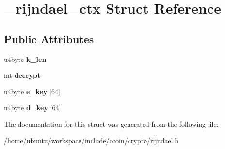 \hypertarget{struct__rijndael__ctx}{\section{\-\_\-rijndael\-\_\-ctx Struct Reference}
\label{struct__rijndael__ctx}
}
\subsection*{Public Attributes}
\begin{DoxyCompactItemize}
\item 
\hypertarget{struct__rijndael__ctx_ac3595b891818be236ee4cbf50995b8af}{u4byte {\bfseries k\-\_\-len}}\label{struct__rijndael__ctx_ac3595b891818be236ee4cbf50995b8af}

\item 
\hypertarget{struct__rijndael__ctx_aa07afd8353126ce5e938b42ceaff42b7}{int {\bfseries decrypt}}\label{struct__rijndael__ctx_aa07afd8353126ce5e938b42ceaff42b7}

\item 
\hypertarget{struct__rijndael__ctx_abc54a82997fe467b97400f22d9b4d7dc}{u4byte {\bfseries e\-\_\-key} \mbox{[}64\mbox{]}}\label{struct__rijndael__ctx_abc54a82997fe467b97400f22d9b4d7dc}

\item 
\hypertarget{struct__rijndael__ctx_a45e6be46127c0bb68886cd4c0c725dc6}{u4byte {\bfseries d\-\_\-key} \mbox{[}64\mbox{]}}\label{struct__rijndael__ctx_a45e6be46127c0bb68886cd4c0c725dc6}

\end{DoxyCompactItemize}


The documentation for this struct was generated from the following file\-:\begin{DoxyCompactItemize}
\item 
/home/ubuntu/workspace/include/ccoin/crypto/rijndael.\-h\end{DoxyCompactItemize}
